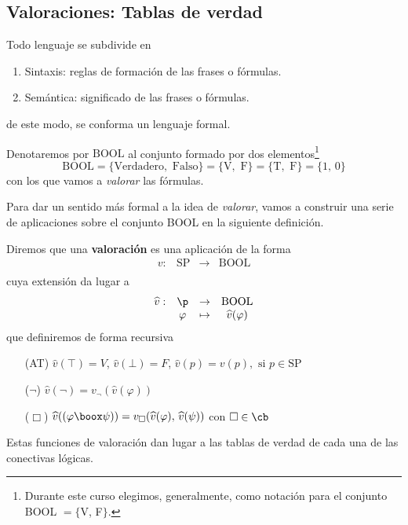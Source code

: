 \subsection{Valoraciones: Tablas de verdad}
Todo lenguaje se subdivide en 
\begin{enumerate}
	\item Sintaxis: reglas de formación de las frases o fórmulas. 
	\item Semántica: significado de las frases o fórmulas. 
\end{enumerate}
de este modo, se conforma un lenguaje formal. 

\begin{definition} Denotaremos por $\mbox{BOOL}$ al conjunto formado por dos elementos\footnote{Durante este curso elegimos, generalmente, como notación para el conjunto BOOL $=\{$V, F$\}$.} 
\[ \mbox{BOOL}= \{\mbox{Verdadero}, \mbox{ Falso} \}=\{\mbox{V}, \mbox{ F} \}=\{\mbox{T}, \mbox{ F} \}=\{1,\, 0\} \]
con los que vamos a \textit{valorar} las fórmulas. 
\end{definition}

Para dar un sentido más formal a la idea de \textit{valorar}, vamos a construir una serie de aplicaciones sobre el conjunto BOOL en la siguiente definición. 
\begin{definition} Diremos que una \textbf{valoración} es una aplicación de la forma 
\[ \begin{matrix}
v: & \mbox{SP} & \rightarrow &\mbox{BOOL}\\
\end{matrix} \]
cuya extensión da lugar a 
\[ \begin{matrix}
\widehat{v}: & \p & \rightarrow &\mbox{BOOL}\\
&\varphi &  \mapsto & \widehat{v}(\varphi)
\end{matrix} \]
que definiremos de forma recursiva
\begin{itemize}
	\item[(AT)] $\widehat{v}(\top)=V$, $\widehat{v}(\bot)=F$, $\widehat{v}(p)=v(p), \mbox{ si } p \in \mbox{SP}$
	\item[($\neg$)] $\widehat{v}(\neg)=v_{\neg}(\widehat{v}(\varphi))$
	\item[($\Box$)] $\widehat{v}((\varphi \boox \psi))= v_{\Box}(\widehat{v}(\varphi), \, \widehat{v}(\psi))$ con $\Box \in \cb$
\end{itemize}
\end{definition}

Estas funciones de valoración dan lugar a las tablas de verdad de cada una de las conectivas lógicas. 
